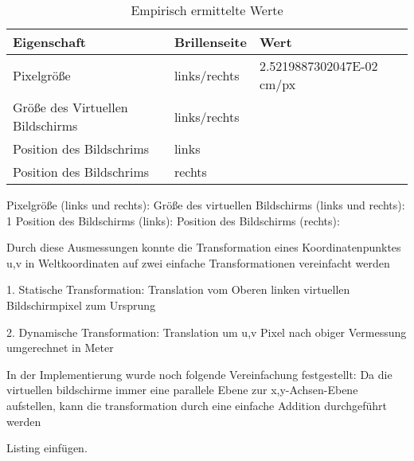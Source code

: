  \begin{table}
 \caption{Empirisch ermittelte Werte}
 \begin{tabular}{l|l|l}
  Eigenschaft & Brillenseite & Wert \\
  \hline
  \hline
  Pixelgröße & links/rechts & 2.5219887302047E-02 cm/px \\
  Größe des Virtuellen Bildschirms & links/rechts &  \\
  Position des Bildschrims & links & \\
  Position des Bildschrims & rechts & \\
 \end{tabular}
 \label{tab:konstanteWerte}
 \end{table}
    
    Pixelgröße (links und rechts):      
    Größe des virtuellen Bildschirms (links und rechts):      1
    Position des Bildschirms (links):
    Position des Bildschirms (rechts):
        
Durch diese Ausmessungen konnte die  Transformation eines Koordinatenpunktes u,v in Weltkoordinaten auf zwei einfache Transformationen vereinfacht werden

    1. Statische Transformation: Translation vom Oberen linken virtuellen Bildschirmpixel zum Ursprung

    2. Dynamische Transformation: Translation um u,v Pixel nach obiger Vermessung umgerechnet in Meter

In der Implementierung wurde noch folgende Vereinfachung festgestellt: Da die virtuellen bildschirme immer eine parallele Ebene zur x,y-Achsen-Ebene aufstellen, kann die transformation durch eine einfache Addition durchgeführt werden

    Listing einfügen.


